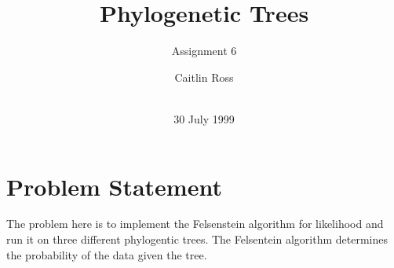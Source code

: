 \documentclass{acm_proc_article-sp}
\begin{document}
\title{Phylogenetic Trees}
\subtitle{Assignment 6}
%
%
%
%
%

%
\author{
	\alignauthor Caitlin Ross\\
	 \\
}

\date{30 July 1999}

\maketitle

\begin{abstract}

\end{abstract}


\section{Problem Statement}
The problem here is to implement the Felsenstein algorithm for likelihood and run it on three different phylogentic trees.  The Felsentein algorithm determines the probability of the data given the tree.  
\end{document}
